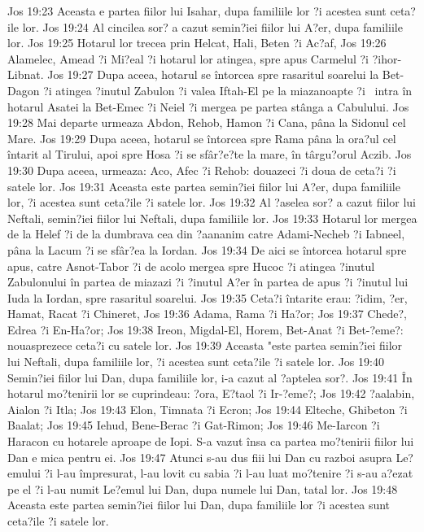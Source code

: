 Jos 19:23  Aceasta e partea fiilor lui Isahar, dupa familiile lor ?i acestea sunt ceta?ile lor.
Jos 19:24  Al cincilea sor? a cazut semin?iei fiilor lui A?er, dupa familiile lor.
Jos 19:25  Hotarul lor trecea prin Helcat, Hali, Beten ?i Ac?af,
Jos 19:26  Alamelec, Amead ?i Mi?eal ?i hotarul lor atingea, spre apus Carmelul ?i ?ihor-Libnat.
Jos 19:27  Dupa aceea, hotarul se întorcea spre rasaritul soarelui la Bet-Dagon ?i atingea ?inutul Zabulon ?i valea Iftah-El pe la miazanoapte ?i  intra în hotarul Asatei la Bet-Emec ?i Neiel ?i mergea pe partea stânga a Cabulului.
Jos 19:28  Mai departe urmeaza Abdon, Rehob, Hamon ?i Cana, pâna la Sidonul cel Mare.
Jos 19:29  Dupa aceea, hotarul se întorcea spre Rama pâna la ora?ul cel întarit al Tirului, apoi spre Hosa ?i se sfâr?e?te la mare, în târgu?orul Aczib.
Jos 19:30  Dupa aceea, urmeaza: Aco, Afec ?i Rehob: douazeci ?i doua de ceta?i ?i satele lor.
Jos 19:31  Aceasta este partea semin?iei fiilor lui A?er, dupa familiile lor, ?i acestea sunt ceta?ile ?i satele lor.
Jos 19:32  Al ?aselea sor? a cazut fiilor lui Neftali, semin?iei fiilor lui Neftali, dupa familiile lor.
Jos 19:33  Hotarul lor mergea de la Helef ?i de la dumbrava cea din ?aananim catre Adami-Necheb ?i Iabneel, pâna la Lacum ?i se sfâr?ea la Iordan.
Jos 19:34  De aici se întorcea hotarul spre apus, catre Asnot-Tabor ?i de acolo mergea spre Hucoc ?i atingea ?inutul  Zabulonului în partea de miazazi ?i ?inutul A?er în partea de apus ?i ?inutul lui Iuda la Iordan, spre rasaritul soarelui.
Jos 19:35  Ceta?i întarite erau: ?idim, ?er, Hamat, Racat ?i Chineret,
Jos 19:36  Adama, Rama ?i Ha?or;
Jos 19:37  Chede?, Edrea ?i En-Ha?or;
Jos 19:38  Ireon, Migdal-El, Horem, Bet-Anat ?i Bet-?eme?: nouasprezece ceta?i cu satele lor.
Jos 19:39  Aceasta "este partea semin?iei fiilor lui Neftali, dupa familiile lor, ?i acestea sunt ceta?ile ?i satele lor.
Jos 19:40  Semin?iei fiilor lui Dan, dupa familiile lor, i-a cazut al ?aptelea sor?.
Jos 19:41  În hotarul mo?tenirii lor se cuprindeau: ?ora, E?taol ?i Ir-?eme?;
Jos 19:42  ?aalabin, Aialon ?i Itla;
Jos 19:43  Elon, Timnata ?i Ecron;
Jos 19:44  Elteche, Ghibeton ?i Baalat;
Jos 19:45  Iehud, Bene-Berac ?i Gat-Rimon;
Jos 19:46  Me-Iarcon ?i Haracon cu hotarele aproape de Iopi. S-a vazut însa ca partea mo?tenirii fiilor lui Dan e mica pentru ei.
Jos 19:47  Atunci s-au dus fiii lui Dan cu razboi asupra Le?emului ?i l-au împresurat, l-au lovit cu sabia ?i l-au luat mo?tenire ?i s-au a?ezat pe el ?i l-au numit Le?emul lui Dan, dupa numele lui Dan, tatal lor.
Jos 19:48  Aceasta este partea semin?iei fiilor lui Dan, dupa familiile lor ?i acestea sunt ceta?ile ?i satele lor.
